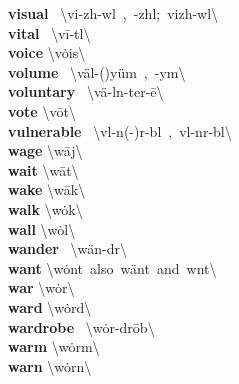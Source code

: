 \documentclass[10pt,a4paper]{article}
\begin{document}
\begin{multicols}{2}
\textbf{ visual }\quad \ \textbackslash \textprimstress vi-zh\textschwa -w\textschwa l\ ,\ -zh\textschwa l;\ \textprimstress vizh-w\textschwa l\textbackslash \\
\textbf{ vital }\quad \ \textbackslash \textprimstress v\={i}-t\textsuperscript{\textreve}l\textbackslash \\
\textbf{ voice }\quad \textbackslash \textprimstress v\.{o}is\textbackslash \\
\textbf{ volume }\quad \ \textbackslash \textprimstress v\"{a}l-(\textsecstress )y\"{u}m\ ,\ -y\textschwa m\textbackslash \\
\textbf{ voluntary }\quad \ \textbackslash \textprimstress v\"{a}-l\textschwa n-\textsecstress ter-\={e}\textbackslash \\
\textbf{ vote }\quad \textbackslash \textprimstress v\={o}t\textbackslash \\
\textbf{ vulnerable }\quad \ \textbackslash \textprimstress v\textschwa l-n(\textschwa -)r\textschwa -b\textschwa l\ ,\ \textprimstress v\textschwa l-n\textschwa r-b\textschwa l\textbackslash \\
\textbf{ wage }\quad \textbackslash \textprimstress w\={a}j\textbackslash \\
\textbf{ wait }\quad \textbackslash \textprimstress w\={a}t\textbackslash \\
\textbf{ wake }\quad \textbackslash \textprimstress w\={a}k\textbackslash \\
\textbf{ walk }\quad \textbackslash \textprimstress w\.{o}k\textbackslash \\
\textbf{ wall }\quad \textbackslash \textprimstress w\.{o}l\textbackslash \\
\textbf{ wander }\quad \ \textbackslash \textprimstress w\"{a}n-d\textschwa r\textbackslash \\
\textbf{ want }\quad \textbackslash \textprimstress w\.{o}nt\ also\ \textprimstress w\"{a}nt\ and\ \textprimstress w\textschwa nt\textbackslash \\
\textbf{ war }\quad \textbackslash \textprimstress w\.{o}r\textbackslash \\
\textbf{ ward }\quad \textbackslash \textprimstress w\.{o}rd\textbackslash \\
\textbf{ wardrobe }\quad \ \textbackslash \textprimstress w\.{o}r-\textsecstress dr\={o}b\textbackslash \\
\textbf{ warm }\quad \textbackslash \textprimstress w\.{o}rm\textbackslash \\
\textbf{ warn }\quad \textbackslash \textprimstress w\.{o}rn\textbackslash \\

\end{multicols}
\end{document}
